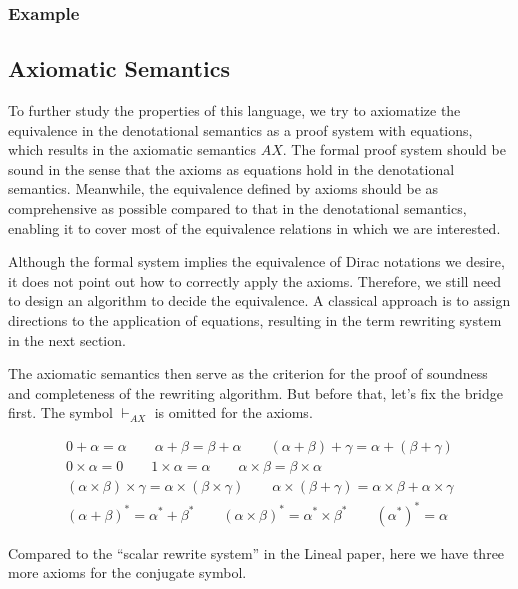 \documentclass[manuscript, review, timestamp]{acmart}
\begin{document}
\subsubsection*{Example}



\subsection{Axiomatic Semantics}

To further study the properties of this language, we try to axiomatize the equivalence in the denotational semantics as a proof system with equations, which results in the axiomatic semantics $AX$. The formal proof system should be sound in the sense that the axioms as equations hold in the denotational semantics. Meanwhile, the equivalence defined by axioms should be as comprehensive as possible compared to that in the denotational semantics, enabling it to cover most of the equivalence relations in which we are interested.

Although the formal system implies the equivalence of Dirac notations we desire, it does not point out how to correctly apply the axioms. Therefore, we still need to design an algorithm to decide the equivalence. A classical approach is to assign directions to the application of equations, resulting in the term rewriting system in the next section.

The axiomatic semantics then serve as the criterion for the proof of soundness and completeness of the rewriting algorithm. But before that, let's fix the bridge first.
The symbol $\vdash_{AX}$ is omitted for the axioms.

\begin{definition}
  \begin{gather*}
    0 + \alpha = \alpha
    \qquad
    \alpha + \beta = \beta + \alpha
    \qquad
    (\alpha + \beta) + \gamma = \alpha + (\beta + \gamma) \\
    0 \times \alpha = 0
    \qquad
    1 \times \alpha = \alpha
    \qquad
    \alpha \times \beta = \beta \times \alpha \\
    (\alpha \times \beta) \times \gamma = \alpha \times (\beta \times \gamma) \qquad
    \alpha \times (\beta + \gamma) = \alpha \times \beta + \alpha \times \gamma \\
    (\alpha + \beta)^* = \alpha^* + \beta^*
    \qquad
    (\alpha \times \beta)^* = \alpha^* \times \beta^*
    \qquad
    (\alpha^*)^* = \alpha
  \end{gather*}
\end{definition}
Compared to the ``scalar rewrite system'' in the Lineal paper\cite{Arrighi2017}, here we have three more axioms for the conjugate symbol.
\end{document}
